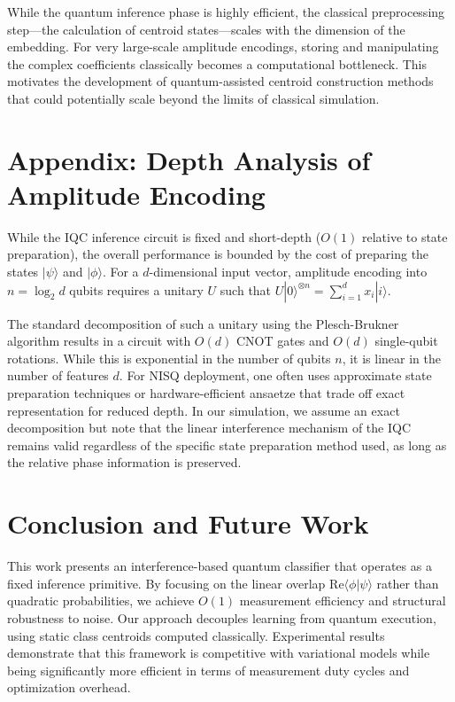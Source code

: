 \documentclass[conference]{IEEEtran}
\begin{document}
While the quantum inference phase is highly efficient, the classical preprocessing step---the calculation of centroid states---scales with the dimension of the embedding. For very large-scale amplitude encodings, storing and manipulating the complex coefficients classically becomes a computational bottleneck. This motivates the development of quantum-assisted centroid construction methods that could potentially scale beyond the limits of classical simulation.

\section*{Appendix: Depth Analysis of Amplitude Encoding}

While the IQC inference circuit is fixed and short-depth ($O(1)$ relative to state preparation), the overall performance is bounded by the cost of preparing the states $|\psi\rangle$ and $|\phi\rangle$. For a $d$-dimensional input vector, amplitude encoding into $n = \log_2 d$ qubits requires a unitary $U$ such that $U|0\rangle^{\otimes n} = \sum_{i=1}^d x_i |i\rangle$.

The standard decomposition of such a unitary using the Plesch-Brukner algorithm \cite{plesch2011quantum} results in a circuit with $O(d)$ CNOT gates and $O(d)$ single-qubit rotations. While this is exponential in the number of qubits $n$, it is linear in the number of features $d$. For NISQ deployment, one often uses approximate state preparation techniques or hardware-efficient ansaetze that trade off exact representation for reduced depth. In our simulation, we assume an exact decomposition but note that the linear interference mechanism of the IQC remains valid regardless of the specific state preparation method used, as long as the relative phase information is preserved.

\section{Conclusion and Future Work}

This work presents an interference-based quantum classifier that operates as a fixed inference primitive. By focusing on the linear overlap $\mathrm{Re}\langle \phi | \psi \rangle$ rather than quadratic probabilities, we achieve $O(1)$ measurement efficiency and structural robustness to noise. Our approach decouples learning from quantum execution, using static class centroids computed classically. Experimental results demonstrate that this framework is competitive with variational models while being significantly more efficient in terms of measurement duty cycles and optimization overhead.
\end{document}
